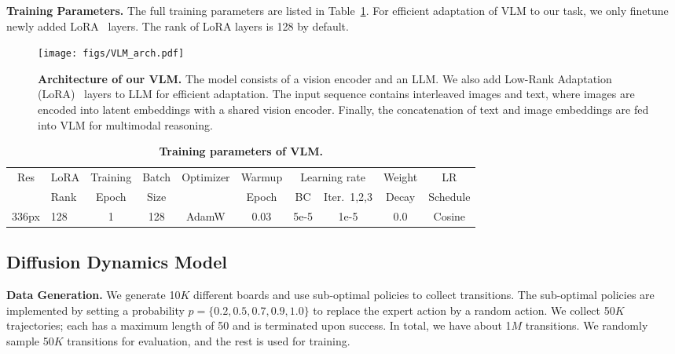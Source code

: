 \noindent \textbf{Training Parameters.} The full training parameters are listed in Table~\ref{tab:vlm_training_params}. For efficient adaptation of VLM to our task, we only finetune newly added LoRA~\cite{hu2022lora} layers. The rank of LoRA layers is 128 by default.

\begin{figure*}[t]
    \centering
    \texttt{[image: figs/VLM\_arch.pdf]}
    \caption{\textbf{Architecture of our VLM.} The model consists of a vision encoder and an LLM. We also add Low-Rank Adaptation (LoRA)~\cite{hu2022lora} layers to LLM for efficient adaptation. The input sequence contains interleaved images and text, where images are encoded into latent embeddings with a shared vision encoder. Finally, the concatenation of text and image embeddings are fed into VLM for multimodal reasoning.}
    \label{fig:vlm_arch}
\end{figure*}

\begin{table}[h]
\caption{\textbf{Training parameters of VLM.}}
\label{tab:vlm_training_params}
\centering
\begin{tabular}{clcccccccc}
\toprule
\multirow{2}{*}{Res} & LoRA & Training & Batch & \multirow{2}{*}{Optimizer} & Warmup & \multicolumn{2}{c}{Learning rate}       & Weight & LR       \\
                     & Rank & Epoch    & Size  &                            & Epoch  & BC & Iter.~1,2,3 & Decay  & Schedule \\
                     \midrule
336px                & 128  & 1        & 128   & AdamW                      & 0.03   & 5e-5   & 1e-5                & 0.0    & Cosine  \\
\bottomrule
\end{tabular}
\end{table}

\subsection{Diffusion Dynamics Model}\label{app:ddm}

\noindent \textbf{Data Generation.} We generate 10$K$ different boards and use sub-optimal policies to collect transitions. The sub-optimal policies are implemented by setting a probability $p=\{0.2, 0.5, 0.7, 0.9, 1.0\}$ to replace the expert action by a random action. We collect 50$K$ trajectories; each has a maximum length of 50 and is terminated upon success. In total, we have about 1$M$ transitions. We randomly sample 50$K$  transitions for evaluation, and the rest is used for training.


